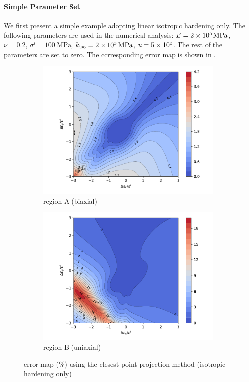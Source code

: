 \paragraph{Simple Parameter Set}
We first present a simple example adopting linear isotropic hardening only.
The following parameters are used in the numerical analysis: $E=\SI{2E5}{\mega\pascal}$, $\nu=0.2$, $\sigma^i=\SI{100}{\mega\pascal}$, $k_\text{iso}=\SI{2E3}{\mega\pascal}$, $u=\num{5E2}$.
The rest of the parameters are set to zero.
The corresponding error map is shown in .
\begin{figure}[htb]
\centering
\begin{subfigure}{.48\textwidth}\centering
    \includegraphics[width=.99\textwidth]{PIC/ISOMAP/error.iso.biaxial.pdf}
    \caption{region A (biaxial)}\label{fig:error_euler_iso_a}
\end{subfigure}\hfill
\begin{subfigure}{.48\textwidth}\centering
    \includegraphics[width=.99\textwidth]{PIC/ISOMAP/error.iso.uniaxial.pdf}
    \caption{region B (uniaxial)}\label{fig:error_euler_iso_b}
\end{subfigure}
\caption{error map (\si{\percent}) using the closest point projection method (isotropic hardening only)}\label{fig:error_euler_isotropic}
\end{figure}

